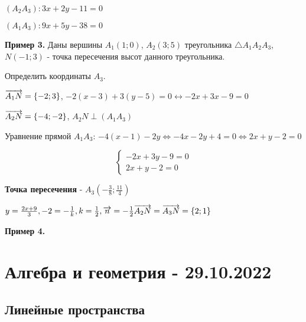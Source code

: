 \documentclass{article}
\def\vec{\ensuremath\overrightarrow}
\begin{document}
\begin{flushleft}
\hfill

$(A_2 A_3): 3x + 2y - 11 = 0$

\hfill 

$(A_1 A_3): 9x + 5y - 38 = 0$

\hfill

\textbf{Пример 3.} Даны вершины $A_1 (1; 0)$, $A_2(3; 5)$ треугольника $\triangle A_1 A_2 A_3$, $N(-1; 3)$ - точка пересечения высот данного треугольника.

Определить координаты $A_3$.

\hfill

$\vec{A_1 N} = \{ -2; 3 \}$, $-2 (x - 3) + 3 (y - 5) = 0 \longleftrightarrow -2x + 3x - 9 = 0$

$\vec{A_2 N} = \{ -4; -2 \}$, $A_2 N \perp (A_1 A_3)$

\hfill

Уравнение прямой $A_1 A_3$: $-4 (x - 1) - 2y \Longleftrightarrow -4x -2y + 4 = 0 \Longleftrightarrow 2x + y - 2 = 0$

\hfill

\begin{equation}
    \begin{cases}
        -2x + 3y - 9 = 0 \\
        2x + y - 2 = 0
    \end{cases}
\end{equation}

\textbf{Точка пересечения} - $A_3 (-\frac{3}{8}; \frac{11}{4})$ 

\hfill

$y = \frac{2x + 9}{3}, -2 = -\frac{1}{k}, k = \frac{1}{2}, \vec{n} = -\frac{1}{2} \vec{A_2 N} = \vec{A_3 N} = \{ 2; 1 \}$

\hfill

\textbf{Пример 4.} 

\end{flushleft}

\pagebreak
\section{Алгебра и геометрия - 29.10.2022}

\subsection{Линейные пространства}
\end{document}
